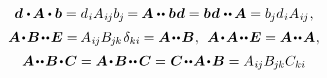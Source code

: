 \nopagebreak\vspace{-0.1em}
\begin{equation}\label{moreusefulequalities.forbivalenttensors}
\begin{gathered}
\bm{d} \hspace{.1ex} \dotp \hspace{-0.15ex} \bm{A} \dotp \bm{b}
= d_{\hspace{.1ex}i} A_{\hspace{.1ex}i\hspace{-0.1ex}j} b_{\hspace{-0.1ex}j} \hspace{-0.2ex}
= \hspace{-0.1ex} \bm{A} \dotdotp \hspace{.1ex} \bm{b} \hspace{.1ex} \bm{d}
= \bm{b} \hspace{.1ex} \bm{d} \hspace{.1ex} \dotdotp \hspace{-0.1ex} \bm{A}
= b_{\hspace{-0.1ex}j} d_{\hspace{.1ex}i} A_{\hspace{.1ex}i\hspace{-0.1ex}j}
\hspace{.1ex} ,
\\[.2em]
%
\bm{A} \narrowdotp \bm{B} \narrowdotdotp \UnitDyad = \hspace{-0.16ex} A_{\hspace{.1ex}i\hspace{-0.1ex}j} B_{\hspace{-0.1ex}j\hspace{-0.1ex}k} \hspace{.2ex} \delta_{ki} \hspace{-0.1ex} = \bm{A} \narrowdotdotp \bm{B}
\hspace{.1ex} ,
\:\:
\bm{A} \narrowdotp \bm{A} \narrowdotdotp \UnitDyad = \bm{A} \narrowdotdotp \bm{A}
\hspace{.1ex} ,
\\[.2em]
%
\bm{A} \narrowdotdotp \bm{B} \narrowdotp \bm{C} = \bm{A} \narrowdotp \bm{B} \narrowdotdotp \hspace{.1ex} \bm{C} = \hspace{.1ex} \bm{C} \narrowdotdotp \hspace{-0.1ex} \bm{A} \narrowdotp \bm{B} = A_{\hspace{.1ex}i\hspace{-0.1ex}j} B_{\hspace{-0.1ex}j\hspace{-0.1ex}k} C_{ki}

\end{gathered}
\end{equation}
